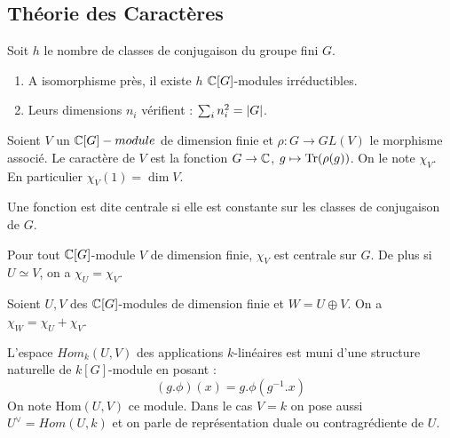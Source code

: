 \documentclass{cours}
\begin{document}
\subsection{Théorie des Caractères}
\begin{theorem}
    Soit $h$ le nombre de classes de conjugaison du groupe fini $G$. 
    \begin{enumerate}
        \item A isomorphisme près, il existe $h$ $\mathbb{C}[G]$-modules irréductibles.
        \item Leurs dimensions $n_{i}$ vérifient : $\sum_{i} n_{i}^{2} = \left|G\right|$.
    \end{enumerate}
\end{theorem}

\begin{definition}
    Soient $V$ un $\mathbb{C}[G]-module$ de dimension finie et $\rho : G \rightarrow GL(V)$ le morphisme associé. Le caractère de $V$ est la fonction $G \to \mathbb{C}$, $g \mapsto \operatorname{Tr}(\rho(g))$. On le note $\chi_{V}$. En particulier $\chi_{V}(1) = \dim V$.
\end{definition}

\begin{definition}
    Une fonction est dite centrale si elle est constante sur les classes de conjugaison de $G$.
\end{definition}

\begin{proposition}
    Pour tout $\mathbb{C}[G]$-module $V$ de dimension finie, $\chi_{V}$ est centrale sur $G$. De plus si $U \simeq V$, on a $\chi_{U} = \chi_{V}$.
\end{proposition}

\begin{proposition}
    Soient $U, V$ des $\mathbb{C}[G]$-modules de dimension finie et $W = U \oplus V$. On a $\chi_{W} = \chi_{U} + \chi_{V}$.
\end{proposition}

\begin{definition}
    L'espace $Hom_{k}(U, V)$ des applications $k$-linéaires est muni d'une structure naturelle de $k[G]$-module en posant : 
    \[
        \left(g.\phi\right)(x) = g.\phi(g^{-1}.x)
    \]
    On note Hom$(U, V)$ ce module. Dans le cas $V = k$ on pose aussi $U^{\lor} = Hom(U, k)$ et on parle de représentation duale ou contragrédiente de $U$. 
\end{definition}
\end{document}
